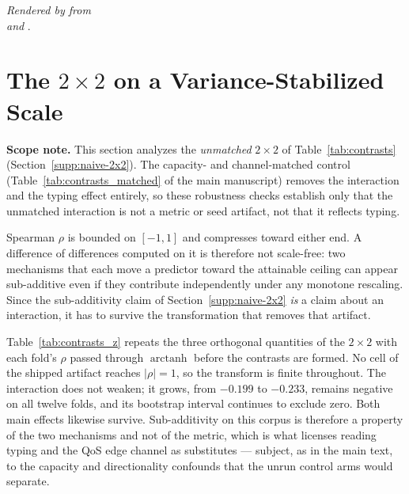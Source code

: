 \documentclass[preprint,3p]{elsarticle}
\begin{document}
\noindent\emph{Rendered by  from}\\
 \emph{and} .

\section{The \texorpdfstring{$2\times2$}{2x2} on a Variance-Stabilized Scale}
\label{supp:fisherz}

\noindent\textbf{Scope note.} This section analyzes the \emph{unmatched} $2\times2$ of Table~\ref{tab:contrasts} (Section~\ref{supp:naive-2x2}). The capacity- and channel-matched control (Table~\ref{tab:contrasts_matched} of the main manuscript) removes the interaction and the typing effect entirely, so these robustness checks establish only that the unmatched interaction is not a metric or seed artifact, not that it reflects typing.

Spearman $\rho$ is bounded on $[-1, 1]$ and compresses toward either end. A
difference of differences computed on it is therefore not scale-free: two
mechanisms that each move a predictor toward the attainable ceiling can appear
sub-additive even if they contribute independently under any monotone
rescaling. Since the sub-additivity claim of Section~\ref{supp:naive-2x2}
\emph{is} a claim about an interaction, it has to survive the transformation
that removes that artifact.

Table~\ref{tab:contrasts_z} repeats the three orthogonal quantities of the
$2\times2$ with each fold's $\rho$ passed through $\operatorname{arctanh}$
before the contrasts are formed. No cell of the shipped artifact reaches
$|\rho| = 1$, so the transform is finite throughout. The interaction does not
weaken; it grows, from $-0.199$ to $-0.233$, remains negative on all twelve
folds, and its bootstrap interval continues to exclude zero. Both main effects
likewise survive. Sub-additivity on this corpus is therefore a property of the
two mechanisms and not of the metric, which is what licenses reading typing and
the QoS edge channel as substitutes --- subject, as in the main text, to the
capacity and directionality confounds that the unrun control arms would
separate.
\end{document}
